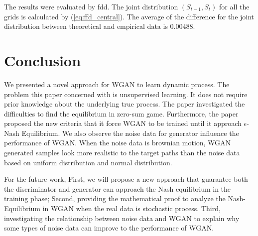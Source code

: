 \documentclass{article}
\begin{document}
	 
	  The results were evaluated by fdd. The joint distribution $(S_{t-1},S_{t})$ for all the grids is calculated by (\ref{eq:ffd_central}). The average of the difference for the joint distribution between theoretical and empirical data is $0.00488$.
	
	
	\section{Conclusion}
	
	We presented a novel approach for WGAN to learn dynamic process.
	The problem this paper concerned with is unsupervised learning.
	It does not require prior knowledge about the underlying true process.
	The paper investigated the difficulties to find the equilibrium in zero-sum game. 
	Furthermore, the paper proposed the new criteria that it force WGAN to be trained until it approach $\epsilon$-Nash Equilibrium. 
	We also observe the noise data for generator influence the performance of WGAN. 
	When the noise data is brownian motion, WGAN generated samples look more realistic to the target paths than the noise data based on uniform distribution and normal distribution.
	
	For the future work, 
	First, we will propose a new approach that guarantee both the discriminator and generator can approach the Nash equilibrium in the training phase;
	Second, providing the mathematical proof to analyze the Nash-Equilibrium in WGAN when the real data is stochastic process.
	Third, investigating the relationship between noise data and WGAN to explain why some types of noise data can improve to the performance of WGAN. 
	 

	\cleardoublepage
	
	
	
	
	
	

	
	
	

	
	
\end{document}
